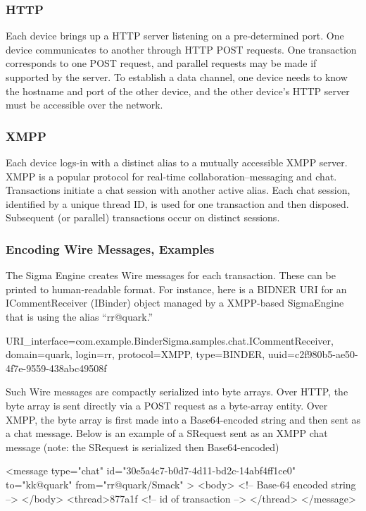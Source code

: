 \documentclass[prodmode]{acmlarge}
\begin{document}
\subsubsection{HTTP}
Each device brings up a HTTP server listening on a pre-determined port. One device communicates to another through HTTP POST requests. One transaction corresponds to one POST request, and parallel requests may be made if supported by the server. To establish a data channel, one device needs to know the hostname and port of the other device, and the other device's HTTP server must be accessible over the network.

\subsubsection{XMPP}
Each device logs-in with a distinct alias to a mutually accessible XMPP server. XMPP is a popular protocol for real-time collaboration--messaging and chat. Transactions initiate a chat session with another active alias. Each chat session, identified by a unique thread ID, is used for one transaction and then disposed. Subsequent (or parallel) transactions occur on distinct sessions.

\subsubsection{Encoding Wire Messages, Examples}
The Sigma Engine creates Wire messages for each transaction. These can be printed to human-readable format. For instance, here is a BIDNER URI for an ICommentReceiver (IBinder) object managed by a XMPP-based SigmaEngine that is using the alias ``rr@quark.''

\begin{snippet}
URI{_interface=com.example.BinderSigma.samples.chat.ICommentReceiver,
domain=quark, login=rr, protocol=XMPP, type=BINDER,
uuid=c2f980b5-ae50-4f7e-9559-438abc49508f}
\end{snippet}

Such Wire messages are compactly serialized into byte arrays. Over HTTP, the byte array is sent directly via a POST request as a byte-array entity. Over XMPP, the byte array is first made into a Base64-encoded string and then sent as a chat message. Below is an example of a SRequest sent as an XMPP chat message (note: the SRequest is serialized then Base64-encoded)

\begin{snippet}
<message type="chat" id="30e5a4c7-b0d7-4d11-bd2c-14abf4ff1ce0"
        to="kk@quark" from="rr@quark/Smack" >
        <body> <!-- Base-64 encoded string --> </body>
        <thread>877a1f <!-- id of transaction --> </thread>
        </message>
\end{snippet}
\end{document}
